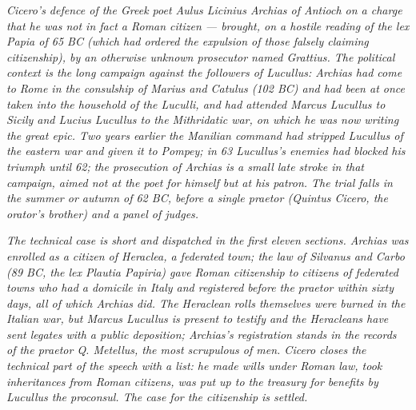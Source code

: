 
\textit{Cicero's defence of the Greek poet Aulus Licinius
Archias of Antioch on a charge that he was not in fact a
Roman citizen --- brought, on a hostile reading of the
\textit{lex Papia} of 65 BC (which had ordered the
expulsion of those falsely claiming citizenship), by an
otherwise unknown prosecutor named Grattius. The political
context is the long campaign against the followers of
Lucullus: Archias had come to Rome in the consulship of
Marius and Catulus (102 BC) and had been at once taken into
the household of the Luculli, and had attended Marcus
Lucullus to Sicily and Lucius Lucullus to the Mithridatic
war, on which he was now writing the great epic. Two years
earlier the Manilian command had stripped Lucullus of the
eastern war and given it to Pompey; in 63 Lucullus's enemies
had blocked his triumph until 62; the prosecution of Archias
is a small late stroke in that campaign, aimed not at the
poet for himself but at his patron. The trial falls in the
summer or autumn of 62 BC, before a single praetor (Quintus
Cicero, the orator's brother) and a panel of judges.}

\textit{The technical case is short and dispatched in the
first eleven sections. Archias was enrolled as a citizen of
Heraclea, a federated town; the law of Silvanus and Carbo
(89 BC, the \textit{lex Plautia Papiria}) gave Roman
citizenship to citizens of federated towns who had a domicile
in Italy and registered before the praetor within sixty
days, all of which Archias did. The Heraclean rolls
themselves were burned in the Italian war, but Marcus
Lucullus is present to testify and the Heracleans have sent
legates with a public deposition; Archias's registration
stands in the records of the praetor Q. Metellus, the most
scrupulous of men. Cicero closes the technical part of the
speech with a list: he made wills under Roman law, took
inheritances from Roman citizens, was put up to the treasury
for benefits by Lucullus the proconsul. The case for the
citizenship is settled.}

